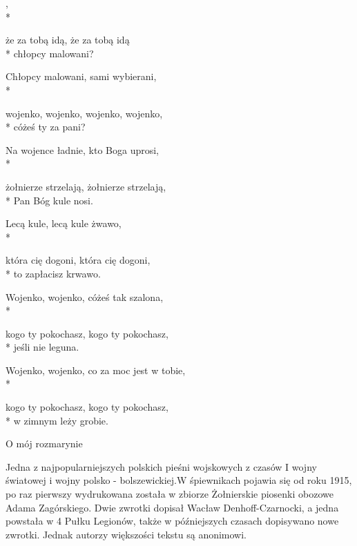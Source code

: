 \begin{lyrics}[longestline={Wojenko, wojenko, co za moc jest w tobie}]

,\\*
\begin{markverses}[marktext={x2}]%
że za tobą idą, że za tobą idą\\*
chłopcy malowani?
\end{markverses}

Chłopcy malowani, sami wybierani,\\*
\begin{markverses}[marktext={x2}]%
wojenko, wojenko, wojenko, wojenko,\\*
cóżeś ty za pani?
\end{markverses}

Na wojence ładnie, kto Boga uprosi,\\*
\begin{markverses}[marktext={x2}]%
żołnierze strzelają, żołnierze strzelają,\\*
Pan Bóg kule nosi.
\end{markverses}

Lecą kule, lecą kule żwawo,\\*
\begin{markverses}[marktext={x2}]%
która cię dogoni, która cię dogoni,\\*
to zapłacisz krwawo.
\end{markverses}

Wojenko, wojenko, cóżeś tak szalona,\\*
\begin{markverses}[marktext={x2}]%
kogo ty pokochasz, kogo ty pokochasz,\\*
jeśli nie leguna.
\end{markverses}

Wojenko, wojenko, co za moc jest w tobie,\\*
\begin{markverses}[marktext={x2}]%
kogo ty pokochasz, kogo ty pokochasz,\\*
w zimnym leży grobie.
\end{markverses}
\end{lyrics}



\song
{O mój rozmarynie}
\begin{info}Jedna z najpopularniejszych polskich pieśni wojskowych z czasów I wojny światowej i wojny polsko - bolszewickiej.W śpiewnikach pojawia się od roku 1915, po raz pierwszy wydrukowana została w zbiorze Żołnierskie piosenki obozowe Adama Zagórskiego. Dwie zwrotki dopisał Wacław Denhoff-Czarnocki, a jedna powstała w 4 Pułku Legionów, także w późniejszych czasach dopisywano nowe zwrotki. Jednak autorzy większości tekstu są anonimowi.\end{info}

